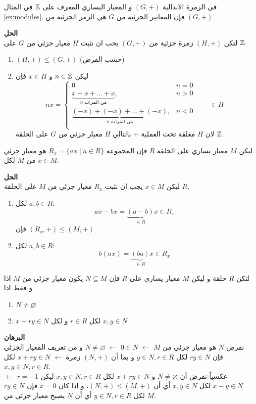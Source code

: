\begin{example}\label{ex:submodules}
	في الزمرة الابدالية $(G,+)$ و المعيار اليساري المعرف على $\mathbb{Z}$ في المثال \ref{ex:modules}. فإن المعايير الجزئية من $G$ هي الزمر الجزئية من $(G,+)$
	\end{example}
	\noindent
	\textbf{الحل}\\
	\noindent
	لتكن $(H,+)$ زمرة جزئية من $(G,+)$ يجب ان نثبت $H$ معيار جزئي من $G$ على $\mathbb{Z}$  
	\begin{enumerate}
		\item $(H, +) \leq (G, +)$ (حسب الفرض)
		\item ليكن $n\in\mathbb{Z}$ و $x\in H$ فإن 
		\[
		nx = 
		\begin{cases}
			0 & n=0 \\
			\underbrace{x+x+\dots+x}_{\text{$n$ من المرات}}, & n>0\\
			\underbrace{(-x)+(-x)+\dots+(-x)}_{\text{$n$ من المرات}}, & n<0\\
		\end{cases}
		\qquad \in H
		\]
		لان $H$ مغلقة تحت العملية + بالتالي $H$ معيار جزئي من $G$ على الحلقة $\mathbb{Z}$.
	\end{enumerate}

	\begin{example}
		 ليكن $M$ معيار يساري على الحلقة $R$ فإن المجموعة $R_x=\{ax\mid a\in R\}$ هو معيار جزئي من $M$ لكل $x\in M$.
	\end{example}
	\noindent
	\textbf{الحل}\\
	\noindent
	ليكن $x\in M$ يجب ان نثبت $R_x$ معيار جزئي من $M$ على الحلقة $R$.
	\begin{enumerate}
		\item لكل $a,b\in R$:
		\[
		ax - bx = \underbrace{(a-b)}_{\in R} x \in R_x
		\]
		فإن $(R_x,+)\leq (M,+)$
		\item لكل $a,b\in R$:
		\[
		b(ax) = \underbrace{(ba)}_{\in R}x \in R_x
		\]
	\end{enumerate}


\begin{theorem}
	لتكن $R$ حلقة و ليكن $M$ معيار يساري على $R$ فإن $N\subseteq M$ يكون معيار جزئي من $M$ اذا و فقط اذا
	\begin{enumerate}
		\item $N\neq \varnothing$
		\item $x+ry\in N$ لكل $r\in R$ و لكل $x,y\in N$
	\end{enumerate}
\end{theorem}
\noindent
\textbf{البرهان}\\
\noindent
نفرض $N$ هو معيار جزئي من $M$ $\leftarrow$ $0\in N$ $\leftarrow$ $N\neq \varnothing$ و من تعريف المعيار الجزئي فإن $ry\in N$ لكل $y\in N, r\in R$ و بما أن $(N,+)$ زمرة $\leftarrow$ $x+ry\in N$ لكل $x,y\in N, r\in R$.\\
عكسياً نفرض أن $N\neq \varnothing$ و $x+ry\in N$ لكل $x,y\in N, r\in R$ ليكن $r=-1$ $\leftarrow$ $x-y\in N$ لكل $x,y\in N$ أي أن $(N,+)\leq (M,+)$، و اذا كان $x=0$ فإن $ry\in N$ لكل $y\in N, r\in R$ أي أن $N$ يصبح معيار جزئي من $M$. \qedsymbol

